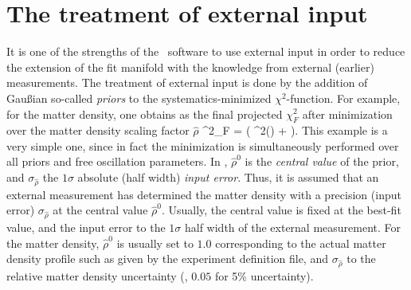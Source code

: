 \section{The treatment of external input}
\label{sec:externalinput}

It is one of the strengths of the \GLOBES\ software to use external input 
in order to reduce the extension of the fit manifold with the knowledge 
from external
(earlier) measurements. The treatment of external input is done by the 
addition of Gau\ss ian so-called {\em priors} to the systematics-minimized 
$\chi^2$-function. For example, for the matter density, one obtains as the 
final projected $\chi^2_F$ after minimization over the matter density
scaling factor  $\hat{\rho}$
\be
 \chi^2_F =  \left( \chi^2(\hat{\rho}) +
  \right).
\label{equ:priors}
\ee
This example is a very simple one, since in fact the
minimization is simultaneously performed over all priors and free oscillation 
parameters. In , $\hat{\rho}^0$ is the {\em central value} of the 
prior, and $\sigma_{\hat{\rho}}$ the $1 \sigma$ absolute (half width) 
{\em input error}. Thus, it is assumed that an external measurement has 
determined the matter density with a precision (input error) 
$\sigma_{\hat{\rho}}$ at the central value $\hat{\rho}^0$. Usually, 
the central value is fixed at the best-fit value, and the input error 
to the $1 \sigma$ half width of the external measurement. For the matter 
density, $\hat{\rho}^0$  is usually set to $1.0$ corresponding to
the actual matter density profile such as given by the experiment
 definition file, and $\sigma_{\hat{\rho}}$ to the 
relative matter density uncertainty (\eg, $0.05$ for 5\% uncertainty).

